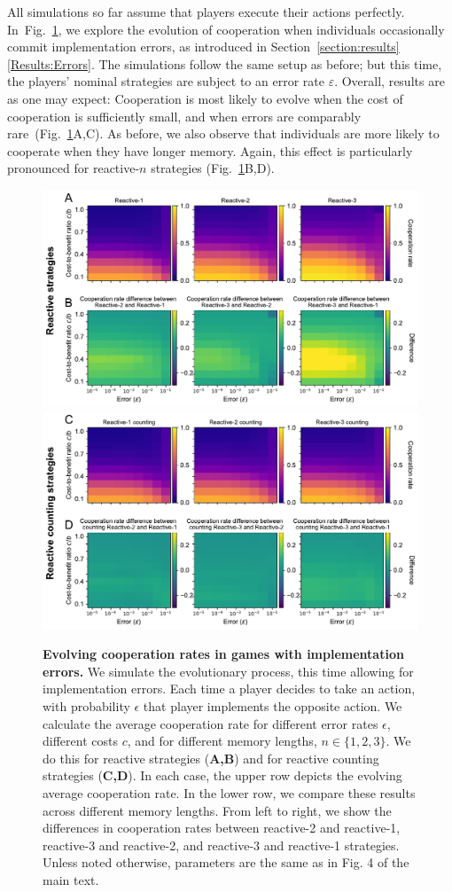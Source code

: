 \documentclass[9pt,twoside,lineno]{pnas-new}
\theoremstyle{plainCl1}
\theoremstyle{plainCl2}
\begin{document}
All simulations so far assume that players execute their actions perfectly. 
In~Fig.~\ref{fig:errors}, we explore the evolution of cooperation when individuals occasionally commit implementation errors, as introduced in Section~\ref{section:results}\ref{Results:Errors}. 
The simulations follow the same setup as before; but this time, the players' nominal strategies are subject to an error rate $\varepsilon$. 
Overall, results are as one may expect: 
Cooperation is most likely to evolve when the cost of cooperation is sufficiently small, and when errors are comparably rare~(Fig.~\ref{fig:errors}A,C). 
As before, we also observe that individuals are more likely to cooperate when they have longer memory.
Again, this effect is particularly pronounced for reactive-$n$ strategies (Fig.~\ref{fig:errors}B,D). 


\begin{figure}[h]
    \centering
    \includegraphics[width=.65\textwidth]{../../figures/siFig2Errors.pdf} \\[2em]
    \includegraphics[width=.65\textwidth]{../../figures/siFigErrorsCounting.pdf}
    \caption{
    \textbf{Evolving cooperation rates in games with implementation errors.}
  We simulate the evolutionary process, this time allowing for implementation
  errors. Each time a player decides to take an action, with probability \(\epsilon\) that player implements the opposite action. 
  We calculate the average cooperation rate for
  different error rates \(\epsilon\), different costs \(c\), and for different memory lengths, $n\!\in\!\{1,2,3\}$.
  We do this for reactive strategies ({\bf A,B}) and for reactive counting strategies ({\bf C,D}). 
  In each case, the upper row depicts the evolving average cooperation rate. 
  In the lower row, we compare these results across different memory lengths.  
  From left to right, we show the differences in cooperation rates between reactive-2
  and reactive-1, reactive-3 and reactive-2, and reactive-3 and reactive-1 strategies.
  Unless noted otherwise, parameters are the same as in Fig. 4 of the main text.
    }\label{fig:errors}
\end{figure}
\end{document}
